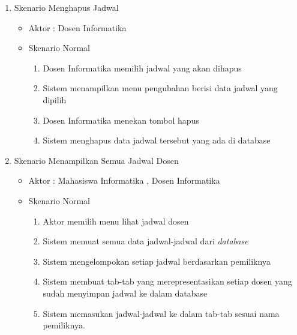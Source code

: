 \begin{enumerate}
	\item Skenario Menghapus Jadwal
	\begin{itemize}
		\item Aktor : Dosen Informatika
		\item Skenario Normal
			\begin{enumerate}[1.]
				\item Dosen Informatika memilih jadwal yang akan dihapus
				\item Sistem menampilkan menu pengubahan berisi data jadwal yang dipilih
				\item Dosen Informatika menekan tombol hapus
				\item Sistem menghapus data jadwal tersebut yang ada di database
			\end{enumerate}
	\end{itemize}

	\item Skenario Menampilkan Semua Jadwal Dosen
	\begin{itemize}
		\item Aktor : Mahasiswa Informatika , Dosen Informatika
		\item Skenario Normal
			\begin{enumerate}[1.]
				\item Aktor memilih menu lihat jadwal dosen
				\item Sistem memuat semua data jadwal-jadwal dari \textit{database}
				\item Sistem mengelompokan setiap jadwal berdasarkan pemiliknya
				\item Sistem membuat tab-tab yang merepresentasikan setiap dosen yang sudah menyimpan jadwal ke dalam database
				\item Sistem memasukan jadwal-jadwal ke dalam tab-tab sesuai nama pemiliknya.
			\end{enumerate}
	\end{itemize}
	


\end{enumerate}
